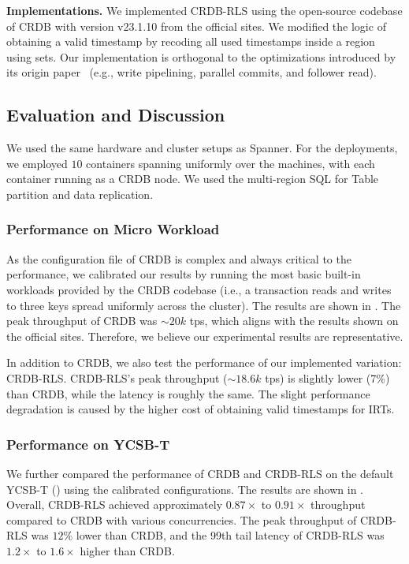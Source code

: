 \noindent\textbf{Implementations.} We implemented CRDB-RLS using the open-source codebase of CRDB with version v23.1.10 from the official sites. We modified the logic of obtaining a valid timestamp by recoding all used timestamps inside a region using sets. Our implementation is orthogonal to the optimizations introduced by its origin paper~\cite{taft2020cockroachdb} (e.g., write pipelining, parallel commits, and follower read). 

\subsection{Evaluation and Discussion} We used the same hardware and cluster setups as Spanner. For the deployments, we employed $10$ containers spanning uniformly over the machines, with each container running as a CRDB node. We used the multi-region SQL for Table partition and data replication.

\subsubsection{Performance on Micro Workload} As the configuration file of CRDB is complex and always critical to the performance, we calibrated our results by running the most basic built-in workloads provided by the CRDB codebase  (i.e., a transaction reads and writes to three keys spread uniformly across the cluster). The results are shown in . The peak throughput of CRDB was $\sim20k$ tps, which aligns with the results shown on the official sites. Therefore, we believe our experimental results are representative. 

In addition to CRDB, we also test the performance of our implemented variation: CRDB-RLS. CRDB-RLS's peak throughput ($\sim18.6k$ tps) is slightly lower (7\%) than CRDB, while the latency is roughly the same. The slight performance degradation is caused by the higher cost of obtaining valid timestamps for IRTs.

\subsubsection{Performance on YCSB-T} We further compared the performance of CRDB and CRDB-RLS on the default YCSB-T () using the calibrated configurations. The results are shown in . Overall, CRDB-RLS achieved approximately $0.87\times$ to $0.91\times$ throughput compared to CRDB with various concurrencies. The peak throughput of CRDB-RLS was $12\%$ lower than CRDB, and the 99th tail latency of CRDB-RLS was $1.2\times$ to $1.6\times$ higher than CRDB.



